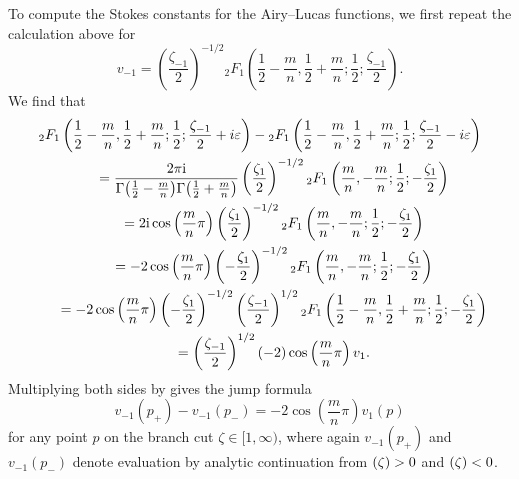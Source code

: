 \documentclass[10pt,a4paper]{amsart}
\let\Im\relax
\DeclareMathOperator{\Im}{Im}
\numberwithin{equation}{section}
\begin{document}
To compute the Stokes constants for the Airy--Lucas functions, we first repeat the calculation above for
\[ v_{-1} = \left(\frac{\zeta_{-1}}{2}\right)^{-1/2} {}_2F_1\left(\frac{1}{2}-\frac{m}{n},\frac{1}{2}+\frac{m}{n};\frac{1}{2};\frac{\zeta_{-1}}{2}\right). \]
We find that
\begin{gather*}
{}_2F_1\left(\frac{1}{2}-\frac{m}{n},\frac{1}{2}+\frac{m}{n};\frac{1}{2};\frac{\zeta_{-1}}{2}+i\varepsilon\right)-{}_2F_1\left(\frac{1}{2}-\frac{m}{n},\frac{1}{2}+\frac{m}{n};\frac{1}{2};\frac{\zeta_{-1}}{2}-i\varepsilon\right) \\
\qquad=\frac{2 \pi {\rm i}}{\Gamma\bigl(\frac{1}{2}-\frac{m}{n}\bigr)\Gamma\bigl(\frac{1}{2}+\frac{m}{n}\bigr)} \left(\frac{\zeta_1}{2}\right)^{-1/2} {}_2F_1\left(\frac{m}{n},-\frac{m}{n};\frac{1}{2};-\frac{\zeta_1}{2}\right) \\
\qquad=2{\rm i}\cos\left(\frac{m}{n}\pi\right) \left(\frac{\zeta_1}{2}\right)^{-1/2} {}_2F_1\left(\frac{m}{n},-\frac{m}{n};\frac{1}{2};-\frac{\zeta_1}{2}\right) \\
\qquad=-2\cos\left(\frac{m}{n}\pi\right) \left(-\frac{\zeta_1}{2}\right)^{-1/2} {}_2F_1\left(\frac{m}{n},-\frac{m}{n};\frac{1}{2};-\frac{\zeta_1}{2}\right) \\
\qquad=-2\cos\left(\frac{m}{n}\pi\right) \left(-\frac{\zeta_{1}}{2}\right)^{-1/2} \left(\frac{\zeta_{-1}}{2}\right)^{1/2} {}_2F_1\left(\frac{1}{2}-\frac{m}{n},\frac{1}{2}+\frac{m}{n};\frac{1}{2};-\frac{\zeta_1}{2}\right) \\
\qquad=\left(\frac{\zeta_{-1}}{2}\right)^{1/2} (-2)\cos\left(\frac{m}{n}\pi\right) v_1.
\end{gather*}
Multiplying both sides by  gives the jump formula
\begin{equation}\label{eqn:resurg-rel-2}
v_{-1}(p_+) - v_{-1}(p_-) = -2\cos\left(\frac{m}{n}\pi\right) v_1(p)
\end{equation}
for any point $p$ on the branch cut $\zeta \in [1, \infty)$, where again $v_{-1}(p_+)$ and $v_{-1}(p_-)$ denote evaluation by analytic continuation from $\Im(\zeta) > 0$ and $\Im(\zeta) < 0$.
\end{document}
